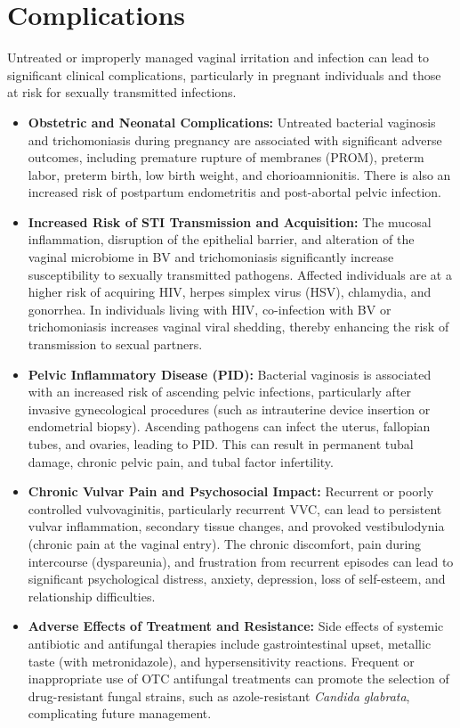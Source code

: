 \section*{Complications}
Untreated or improperly managed vaginal irritation and infection can lead to significant clinical complications, particularly in pregnant individuals and those at risk for sexually transmitted infections.
\begin{itemize}
    \item \textbf{Obstetric and Neonatal Complications:} Untreated bacterial vaginosis and trichomoniasis during pregnancy are associated with significant adverse outcomes, including premature rupture of membranes (PROM), preterm labor, preterm birth, low birth weight, and chorioamnionitis. There is also an increased risk of postpartum endometritis and post-abortal pelvic infection.
    \item \textbf{Increased Risk of STI Transmission and Acquisition:} The mucosal inflammation, disruption of the epithelial barrier, and alteration of the vaginal microbiome in BV and trichomoniasis significantly increase susceptibility to sexually transmitted pathogens. Affected individuals are at a higher risk of acquiring HIV, herpes simplex virus (HSV), chlamydia, and gonorrhea. In individuals living with HIV, co-infection with BV or trichomoniasis increases vaginal viral shedding, thereby enhancing the risk of transmission to sexual partners.
    \item \textbf{Pelvic Inflammatory Disease (PID):} Bacterial vaginosis is associated with an increased risk of ascending pelvic infections, particularly after invasive gynecological procedures (such as intrauterine device insertion or endometrial biopsy). Ascending pathogens can infect the uterus, fallopian tubes, and ovaries, leading to PID. This can result in permanent tubal damage, chronic pelvic pain, and tubal factor infertility.
    \item \textbf{Chronic Vulvar Pain and Psychosocial Impact:} Recurrent or poorly controlled vulvovaginitis, particularly recurrent VVC, can lead to persistent vulvar inflammation, secondary tissue changes, and provoked vestibulodynia (chronic pain at the vaginal entry). The chronic discomfort, pain during intercourse (dyspareunia), and frustration from recurrent episodes can lead to significant psychological distress, anxiety, depression, loss of self-esteem, and relationship difficulties.
    \item \textbf{Adverse Effects of Treatment and Resistance:} Side effects of systemic antibiotic and antifungal therapies include gastrointestinal upset, metallic taste (with metronidazole), and hypersensitivity reactions. Frequent or inappropriate use of OTC antifungal treatments can promote the selection of drug-resistant fungal strains, such as azole-resistant \textit{Candida glabrata}, complicating future management.
\end{itemize}

